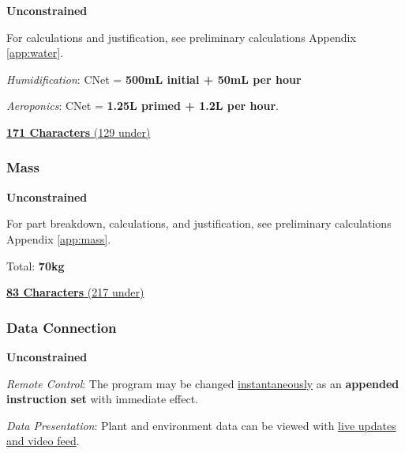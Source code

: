 \documentclass{../tex/report}
\begin{document}
\textbf{Unconstrained}

For calculations and justification, see preliminary calculations Appendix \ref{app:water}.

\textit{Humidification}: CNet = \textbf{500mL initial + 50mL per hour}

\textit{Aeroponics}: CNet = \textbf{1.25L primed + 1.2L per hour}.

\uline{\textbf{171 Characters} (129 under)}

\vspace{0.5cm}

\subsubsection{Mass} 
\label{sec:constraints-mass}

\textbf{Unconstrained}

For part breakdown, calculations, and justification, see preliminary calculations Appendix \ref{app:mass}.

Total: \textbf{70kg}

\uline{\textbf{83 Characters} (217 under)}

\vspace{0.5cm}

\subsubsection{Data Connection} 
\label{sec:constraints-data}

\textbf{Unconstrained}

\textit{Remote Control}: The program may be changed \uline{instantaneously} as an \textbf{appended instruction set} with immediate effect.

\textit{Data Presentation}: Plant and environment data can be viewed with \uline{live updates and video feed}.
\end{document}
